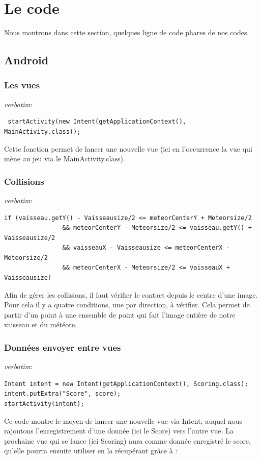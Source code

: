 \documentclass{article}
\begin{document}
\section{Le code}
Nous montrons dans cette section, quelques ligne de code phares de nos codes.

\subsection{Android}

\subsubsection{Les vues}
\textit{verbatim}:
\begin{verbatim}
 startActivity(new Intent(getApplicationContext(), MainActivity.class));
\end{verbatim}

Cette fonction permet de lancer une nouvelle vue (ici en l’occurrence la vue qui mène au jeu via le MainActivity.class).

\subsubsection{Collisions}
\textit{verbatim}:
\begin{verbatim}
if (vaisseau.getY() - Vaisseausize/2 <= meteorCenterY + Meteorsize/2
                && meteorCenterY - Meteorsize/2 <= vaisseau.getY() + Vaisseausize/2
                && vaisseauX - Vaisseausize <= meteorCenterX - Meteorsize/2
                && meteorCenterX - Meteorsize/2 <= vaisseauX + Vaisseausize)
\end{verbatim}

Afin de gérer les collisions, il faut vérifier le contact depuis le centre d'une image. Pour cela il y a quatre conditions, une par direction, à vérifier. Cela permet de partir d'un point à une ensemble de point qui fait l'image entière de notre vaisseau et du météore.

\subsubsection{Données envoyer entre vues}
\textit{verbatim}:
\begin{verbatim}
Intent intent = new Intent(getApplicationContext(), Scoring.class);
intent.putExtra("Score", score);     
startActivity(intent);
\end{verbatim}

Ce code montre le moyen de lancer une nouvelle vue via Intent, auquel nous rajoutons l'enregistrement d'une donnée (ici le Score) vers l'autre vue. La prochaine vue qui se lance (ici Scoring) aura comme donnée enregistré le score, qu'elle pourra ensuite utiliser en la récupérant grâce à :
\end{document}
